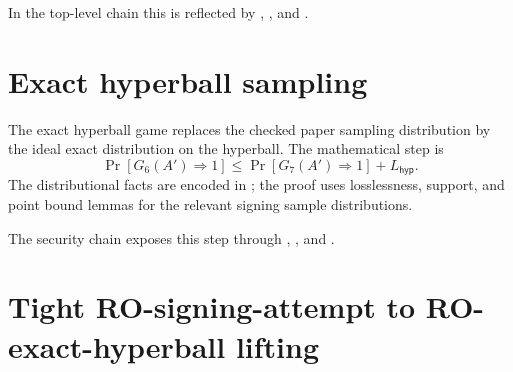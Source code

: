 In the top-level chain this is reflected by
,
,
and
.

\section{Exact hyperball sampling}
\label{sec:paper-proof-exact-hyperball}

The exact hyperball game replaces the checked paper sampling distribution by the
ideal exact distribution on the hyperball.  The mathematical step is
\[
  \Pr[G_6(A')\Rightarrow 1]
  \le
  \Pr[G_7(A')\Rightarrow 1] + L_{\mathsf{hyp}}.
\]
The distributional facts are encoded in
; the proof uses losslessness, support, and point
bound lemmas for the relevant signing sample distributions.

The security chain exposes this step through
,
,
and
.

\section{Tight RO-signing-attempt to RO-exact-hyperball lifting}
\label{sec:paper-proof-budgeted-lifting}

